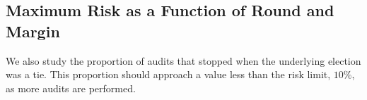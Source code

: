 \subsection{Maximum Risk as a Function of Round and Margin}
We also study the proportion of audits that stopped when the underlying election was a tie.
This proportion should approach a value less than the risk limit, $10\%$, as more audits are performed.


\begin{comment}
\begin{figure}
\begin{minipage}{.5\textwidth}
\texttt{[image: bravo\_risks\_same\_plot.png]}
\caption{This plot shows the fraction of EoR \BRAVO audits (all states with margins at least $0.05$) and SO \BRAVO audits (the 13 states for which our simulations are complete so far) that stopped in any of the $5$ rounds when the underlying election was a tie.}
\label{fig:bravo_risk}
\end{minipage}
\begin{minipage}{.5\textwidth}
\texttt{[image: minerva\_multiround\_1p5x\_10^4/total\_risk.png]}
\caption{This plot shows, for each state margin,
the fraction of \Minerva audits with a round size multiple of $1.5$ that stopped in any of the $5$ rounds when the underlying election was a tie.}
\label{fig:risk}
\end{minipage}
\end{figure}
\end{comment}

